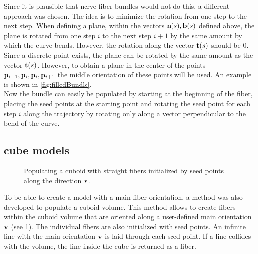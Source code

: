 % 
Since it is plausible that nerve fiber bundles would not do this, a different approach was chosen.
The idea is to minimize the rotation from one step to the next step.
When defining a plane, within the vectors $\mathbf{n}(s),\mathbf{b}(s)$ defined above, the plane is rotated from one step $i$ to the next step $i+1$ by the same amount by which the curve bends.
However, the rotation along the vector $\mathbf{t}(s)$ should be $0$.
Since a discrete point exists, the plane can be rotated by the same amount as the vector $\mathbf{t}(s)$.
However, to obtain a plane in the center of the points $\mathbf{p}_{i-1}, \mathbf{p}_{i}, \mathbf{p}_{i}, \mathbf{p}_{i+1}$ the middle orientation of these points will be used.
An example is shown in \cref{fig:filledBundle}.
\\
% 
Now the bundle can easily be populated by starting at the beginning of the fiber, placing the seed points at the starting point and rotating the seed point for each step $i$ along the trajectory by rotating only along a vector perpendicular to the bend of the curve.
% 
\subsection{cube models} \label{sec:cubeModelBuilding}
% 
\begin{figure}[!t]
    \centering
    \setlength{\tikzwidth}{0.5\textwidth}
	\caption{Populating a cuboid with straight fibers initialized by seed points along the direction $\mathbf{v}$.}
    \label{fig:cubeBuild}%
\end{figure}
% 
To be able to create a model with a main fiber orientation, a method was also developed to populate a cuboid volume.
This method allows to create fibers within the cuboid volume that are oriented along a user-defined main orientation $\mathbf{v}$ (see \cref{fig:cubeBuild}). 
The individual fibers are also initialized with seed points.
An infinite line with the main orientation $\mathbf{v}$ is laid through each seed point.
If a line collides with the volume, the line inside the cube is returned as a fiber.
% 
